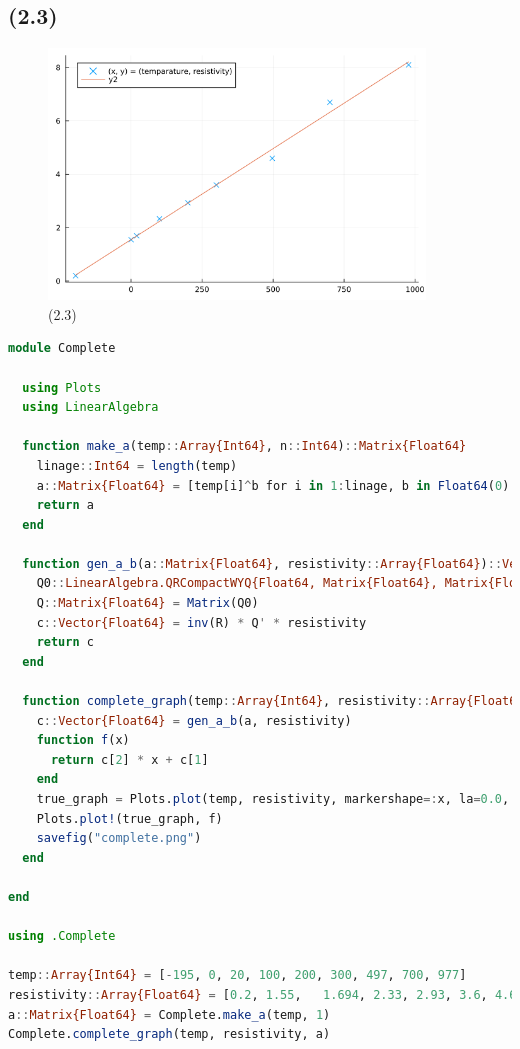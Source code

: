 \documentclass[uplatex, dvipdfmx, a4j,11pt]{jsarticle}
\begin{document}
\subsection*{(2.3)}
\begin{figure}[h]
  \begin{center}
    \includegraphics[width=100mm]{complete.png}
    \caption{(2.3)}
  \end{center}
\end{figure}
\begin{lstlisting}[title={(2-3)}, label=code:in, language=Julia]
module Complete

  using Plots
  using LinearAlgebra

  function make_a(temp::Array{Int64}, n::Int64)::Matrix{Float64}
    linage::Int64 = length(temp)
    a::Matrix{Float64} = [temp[i]^b for i in 1:linage, b in Float64(0):Float64(n)]
    return a
  end

  function gen_a_b(a::Matrix{Float64}, resistivity::Array{Float64})::Vector{Float64}
    Q0::LinearAlgebra.QRCompactWYQ{Float64, Matrix{Float64}, Matrix{Float64}}, R::Matrix{Float64} = LinearAlgebra.qr(a)
    Q::Matrix{Float64} = Matrix(Q0)
    c::Vector{Float64} = inv(R) * Q' * resistivity
    return c
  end

  function complete_graph(temp::Array{Int64}, resistivity::Array{Float64}, a::Matrix{Float64})
    c::Vector{Float64} = gen_a_b(a, resistivity)
    function f(x)
      return c[2] * x + c[1]
    end
    true_graph = Plots.plot(temp, resistivity, markershape=:x, la=0.0,  label="(x, y) = (temparature, resistivity)")
    Plots.plot!(true_graph, f)
    savefig("complete.png")
  end

end

using .Complete

temp::Array{Int64} = [-195, 0, 20, 100, 200, 300, 497, 700, 977]
resistivity::Array{Float64} = [0.2,	1.55,	1.694, 2.33, 2.93, 3.6, 4.6, 6.7, 8.1]
a::Matrix{Float64} = Complete.make_a(temp, 1)
Complete.complete_graph(temp, resistivity, a)

\end{lstlisting}
\end{document}
